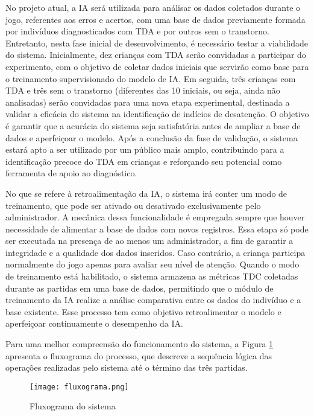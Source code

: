 No projeto atual, a IA será utilizada para análisar os dados coletados durante o jogo, referentes aos erros e acertos, com uma base de dados previamente formada por indivíduos diagnosticados com TDA e por outros sem o transtorno. Entretanto, nesta fase inicial de desenvolvimento, é necessário testar a viabilidade do sistema. Inicialmente, dez crianças com TDA serão convidadas a participar do experimento, com o objetivo de coletar dados iniciais que servirão como base para o treinamento supervisionado do modelo de IA. Em seguida, três crianças com TDA e três sem o transtorno (diferentes das 10 iniciais, ou seja, ainda não analisadas) 
serão convidadas para uma nova etapa experimental, destinada a validar a eficácia do sistema na identificação de indícios de desatenção. O objetivo é garantir que a acurácia do sistema seja satisfatória antes de ampliar a base de dados e aperfeiçoar o modelo. Após a conclusão da fase de validação, o sistema estará apto a ser utilizado por um público mais amplo, contribuindo para a identificação precoce do TDA em crianças e reforçando seu potencial como ferramenta de apoio ao diagnóstico. 

No que se refere à retroalimentação da IA, o sistema irá conter um modo de treinamento, que pode ser ativado ou desativado exclusivamente pelo administrador. A mecânica dessa funcionalidade é empregada sempre que houver necessidade de alimentar a base de dados com novos registros. Essa etapa só pode ser executada na presença de ao menos um administrador, a fim de garantir a integridade e a qualidade dos dados inseridos. Caso contrário, a criança participa normalmente do jogo apenas para avaliar seu nível de atenção. Quando o modo de treinamento está habilitado, o sistema armazena as métricas TDC coletadas durante as partidas em uma base de dados, permitindo que o módulo de treinamento da IA realize a análise comparativa entre os dados do indivíduo e a base existente. Esse processo tem como objetivo retroalimentar o modelo e aperfeiçoar continuamente o desempenho da IA. 

Para uma melhor compreensão do funcionamento do sistema, a Figura \ref{fig:fluxograma} apresenta o fluxograma do processo, que descreve a sequência lógica das operações realizadas pelo sistema até o término das três partidas. 

\begin{figure}[H]
    \centering
    \caption{Fluxograma do sistema}%
    \label{fig:fluxograma}
    \texttt{[image: fluxograma.png]}%
\end{figure}

